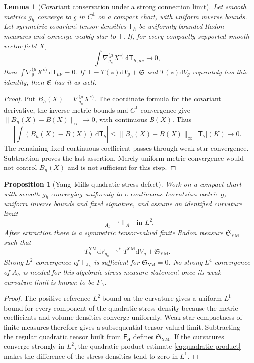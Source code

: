 \documentclass[11pt]{article}
\numberwithin{equation}{section}
\newtheorem{proposition}[proposition]{Proposition}
\newtheorem{lemma}[lemma]{Lemma}
\theoremstyle{definition}
\theoremstyle{remark}
\newcommand{\dd}{\mathrm d}
\newcommand{\norm}[1]{\lVert#1\rVert}
\newcommand{\Fcurv}{\mathsf F}
\newcommand{\dV}{\dd V}
\begin{document}
\begin{lemma}[Covariant conservation under a strong connection limit]
\label{lem:defect-conservation-transport}
Let smooth metrics $g_h$ converge to $g$ in $C^1$ on a compact chart, with
uniform inverse bounds. Let symmetric covariant tensor densities
$\mathsf T_h$ be uniformly bounded Radon measures and converge weakly star
to $\mathsf T$. If, for every compactly supported smooth vector field $X$,
\begin{equation}
 \int \nabla_{g_h}^{(\mu}X^{\nu)}\,\dd\mathsf T_{h,\mu\nu}\longrightarrow0,
 \label{eq:defect-conservation-tested}
\end{equation}
then $\int\nabla_g^{(\mu}X^{\nu)}\,\dd\mathsf T_{\mu\nu}=0$.
If $\mathsf T=T(z)\dV_g+\mathfrak S$ and $T(z)\dV_g$ separately has this
identity, then $\mathfrak S$ has it as well.
\end{lemma}
\begin{proof}
Put $B_h(X)=\nabla_{g_h}^{(\mu}X^{\nu)}$. The coordinate formula for the
covariant derivative, the inverse-metric bounds and $C^1$ convergence give
$\norm{B_h(X)-B(X)}_\infty\to0$, with continuous $B(X)$. Thus
\[
 \left|\int(B_h(X)-B(X))\,\dd\mathsf T_h\right|
 \le\norm{B_h(X)-B(X)}_\infty\,|\mathsf T_h|(K)\to0.
\]
The remaining fixed continuous coefficient passes through weak-star
convergence. Subtraction proves the last assertion. Merely uniform metric
convergence would not control $B_h(X)$ and is not sufficient for this step.
\end{proof}

\begin{proposition}[Yang--Mills quadratic stress defect]
\label{prop:YM-defect}
Work on a compact chart with smooth $g_h$ converging uniformly to a continuous
Lorentzian metric $g$, uniform inverse bounds and fixed signature, and assume
an identified curvature limit
\[
 \Fcurv_{A_h}\rightharpoonup\Fcurv_A\quad\text{in }L^2.
\]
After extraction there is a symmetric tensor-valued finite Radon measure $\mathfrak S_{\mathrm{YM}}$ such that
\begin{equation}
 T^{\mathrm{YM}}_h\dV_{g_h}
 \rightharpoonup^*
 T^{\mathrm{YM}}\dV_g+\mathfrak S_{\mathrm{YM}}.
 \label{eq:YM-defect}
\end{equation}
Strong $L^2$ convergence of $\Fcurv_{A_h}$ is sufficient for
$\mathfrak S_{\mathrm{YM}}=0$. No strong $L^4$ convergence of $A_h$ is
needed for this algebraic stress-measure statement once its weak curvature
limit is known to be $F_A$.
\end{proposition}
\begin{proof}
The positive reference $L^2$ bound on the curvature gives a uniform $L^1$ bound for every component of the quadratic stress density because the metric coefficients and volume densities converge uniformly.  Weak-star compactness of finite measures therefore gives a subsequential tensor-valued limit.  Subtracting the regular quadratic tensor built from $\Fcurv_A$ defines $\mathfrak S_{\mathrm{YM}}$.  If the curvatures converge strongly in $L^2$, the quadratic product estimate \eqref{eq:quadratic-product} makes the difference of the stress densities tend to zero in $L^1$.
\end{proof}
\end{document}
